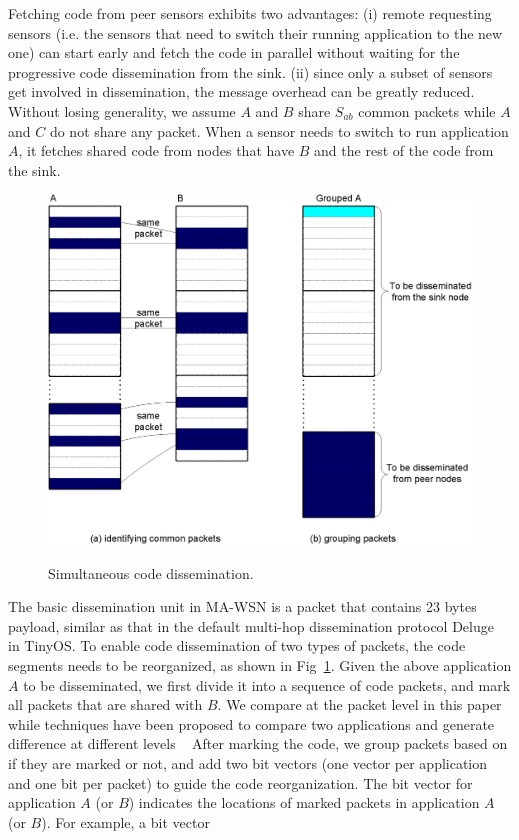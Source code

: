 Fetching code from peer sensors exhibits two advantages:
(i) remote requesting sensors (i.e. the sensors that
need to switch their running application to the new one) can
start early and fetch the code in parallel without waiting for
the progressive code dissemination from the sink. (ii) since
only a subset of sensors get involved in dissemination, the
message overhead can be greatly reduced. Without losing
generality, we assume $A$ and $B$ share $S_{ab}$ common packets
while $A$ and $C$ do not share any packet. When a sensor
needs to switch to run application $A$, it fetches shared code
from nodes that have $B$ and the rest of the code from the
sink.

\begin{figure}[htbp]
\begin{center}
\includegraphics[width=4.5in]{figures/common.eps}
\caption{Simultaneous code dissemination.}
\vspace{-0.3in}
\label{common}
\end{center}
\end{figure}

The basic dissemination unit in MA-WSN is a packet
that contains 23 bytes payload, similar as that in the default
multi-hop dissemination protocol Deluge~\cite{deluge} in TinyOS. To
enable code dissemination of two types of packets, the code
segments needs to be reorganized, as shown in Fig~\ref{common}. Given
the above application $A$ to be disseminated, we first divide
it into a sequence of code packets, and mark all packets
that are shared with $B$. We compare at the packet level in
this paper while techniques have been proposed to compare
two applications and generate difference at different levels
~\cite{melete,ucc} After marking the code, we group packets based
on if they are marked or not, and add two bit vectors (one
vector per application and one bit per packet) to guide the
code reorganization. The bit vector for application $A$ (or
$B$) indicates the locations of marked packets in application
$A$(or $B$). For example, a bit vector 